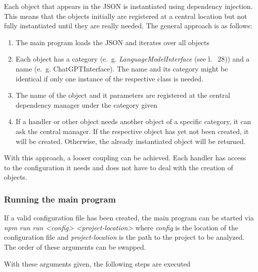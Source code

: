 Each object that appears in the \ac{JSON} is instantiated using dependency injection. This means that the objects initially are registered at a central location but not fully instantiated until they are really needed. The general approach is as follows:
\begin{enumerate}
    \item The main program loads the \ac{JSON} and iterates over all objects
    \item Each object has a category (e.~g. \textit{LanguageModelInterface} (see l.~ 28)) and a name (e.~g. ChatGPTInterface). The name and its category might be identical if only one instance of the respective class is needed. 
    \item The name of the object and it parameters are registered at the central dependency manager under the category given
    \item If a handler or other object needs another object of a specific category, it can ask the central manager. If the respective object has  yet not been created, it will be created. Otherwise, the already instantiated object will be returned. 
\end{enumerate}
With this approach, a looser coupling can be achieved. Each handler has access to the configuration it needs and does not have to deal with the creation of objects. 
\subsubsection{Running the main program}


If a valid configuration file has been created, the main program can be started via \textit{npm run run <config> <project-location>} where \textit{config} is the location of the configuration file and \textit{project-location} is the path to the project to be analyzed. The order of these arguments can be swapped. 

With these arguments given, the following steps are executed

